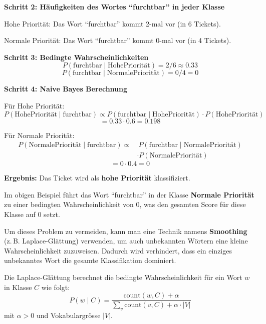 \begin{myexercise}
\begin{myanswer}
        \textbf{Schritt 2: Häufigkeiten des Wortes \enquote{furchtbar} in jeder Klasse}

        Hohe Priorität: Das Wort \enquote{furchtbar} kommt 2-mal vor (in 6 Tickets).

        Normale Priorität: Das Wort \enquote{furchtbar} kommt 0-mal vor (in 4 Tickets).

        \textbf{Schritt 3: Bedingte Wahrscheinlichkeiten}
        \[
            P(\text{furchtbar}\mid\text{HohePriorität}) = 2/6 \approx 0.33
        \]
        \[
            P(\text{furchtbar}\mid\text{NormalePriorität}) = 0/4 = 0
        \]

        \textbf{Schritt 4: Naive Bayes Berechnung}

        Für Hohe Priorität:
        \[
            P(\text{HohePriorität}\mid\text{furchtbar})  \propto P(\text{furchtbar}\mid\text{HohePriorität}) \cdot P(\text{HohePriorität})
        \]
        \[
            = 0.33 \cdot 0.6 = 0.198
        \]

        Für Normale Priorität:
        \[
            \begin{aligned}
                P(\text{NormalePriorität}\mid\text{furchtbar}) \propto & \ P(\text{furchtbar}\mid\text{NormalePriorität}) \\
                                                                  & \cdot P(\text{NormalePriorität})
            \end{aligned}
        \]
        \[
            = 0 \cdot 0.4 = 0
        \]

        \textbf{Ergebnis:} Das Ticket wird als \textbf{hohe Priorität} klassifiziert.
    \end{myanswer}
\end{myexercise}
\begin{mydefinition}[Smoothing]
    Im obigen Beispiel führt das Wort \enquote{furchtbar} in der Klasse \textbf{Normale Priorität} zu einer bedingten Wahrscheinlichkeit von 0, was den gesamten Score für diese Klasse auf 0 setzt.

    Um dieses Problem zu vermeiden, kann man eine Technik namens \textbf{Smoothing} (z.\,B. Laplace-Glättung) verwenden, um auch unbekannten Wörtern eine kleine Wahrscheinlichkeit zuzuweisen. Dadurch wird verhindert, dass ein einziges unbekanntes Wort die gesamte Klassifikation dominiert.

    Die Laplace-Glättung berechnet die bedingte Wahrscheinlichkeit für ein Wort $w$ in Klasse $C$ wie folgt:
    \[
        P(w\mid C)=\frac{\text{count}(w,C)+\alpha}{\sum_v \text{count}(v,C)+\alpha\cdot |V|}
    \]
    mit $\alpha>0$ und Vokabulargrösse $|V|$.
\end{mydefinition}

